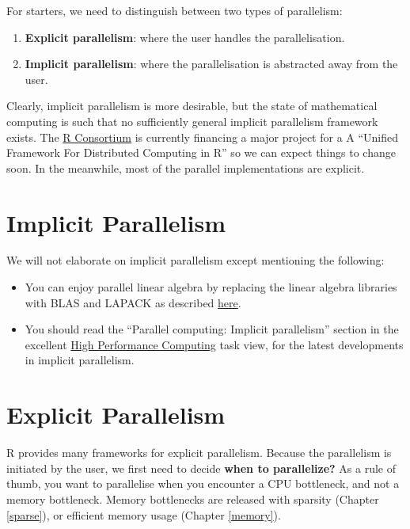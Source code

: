 \documentclass[]{book}
\providecommand{\tightlist}{%
  \setlength{\itemsep}{0pt}\setlength{\parskip}{0pt}}
\theoremstyle{definition}
\theoremstyle{definition}
\theoremstyle{definition}
\theoremstyle{remark}
\begin{document}
For starters, we need to distinguish between two types of parallelism:

\begin{enumerate}
\def\labelenumi{\arabic{enumi}.}
\tightlist
\item
  \textbf{Explicit parallelism}: where the user handles the
  parallelisation.
\item
  \textbf{Implicit parallelism}: where the parallelisation is abstracted
  away from the user.
\end{enumerate}

Clearly, implicit parallelism is more desirable, but the state of
mathematical computing is such that no sufficiently general implicit
parallelism framework exists. The
\href{https://www.r-consortium.org/projects/awarded-projects}{R
Consortium} is currently financing a major project for a A ``Unified
Framework For Distributed Computing in R'' so we can expect things to
change soon. In the meanwhile, most of the parallel implementations are
explicit.

\section{Implicit Parallelism}\label{implicit-parallelism}

We will not elaborate on implicit parallelism except mentioning the
following:

\begin{itemize}
\tightlist
\item
  You can enjoy parallel linear algebra by replacing the linear algebra
  libraries with BLAS and LAPACK as described
  \href{https://www.r-bloggers.com/faster-r-through-better-blas/}{here}.
\item
  You should read the ``Parallel computing: Implicit parallelism''
  section in the excellent
  \href{https://cran.r-project.org/web/views/HighPerformanceComputing.html}{High
  Performance Computing} task view, for the latest developments in
  implicit parallelism.
\end{itemize}

\section{Explicit Parallelism}\label{explicit-parallelism}

R provides many frameworks for explicit parallelism. Because the
parallelism is initiated by the user, we first need to decide
\textbf{when to parallelize?} As a rule of thumb, you want to
parallelise when you encounter a CPU bottleneck, and not a memory
bottleneck. Memory bottlenecks are released with sparsity (Chapter
\ref{sparse}), or efficient memory usage (Chapter \ref{memory}).
\end{document}
